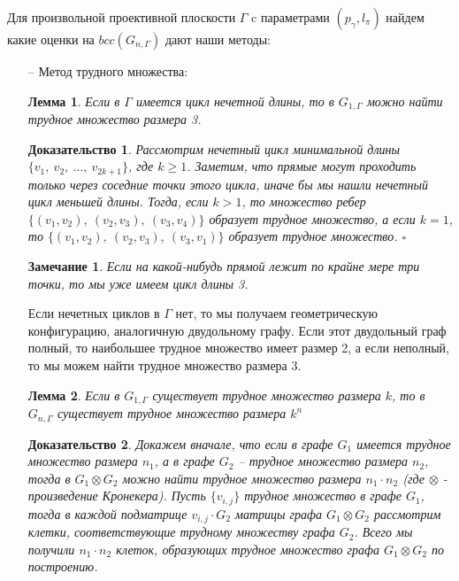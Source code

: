 \documentclass[a4paper]{article}
\newtheorem*{mremark}{Замечание}
\newtheorem*{mlemma}{Лемма}
\newtheorem*{msolution}{Доказательство}
\begin{document}
Для произвольной проективной плоскости $\Gamma$ c параметрами $(p_{\gamma}, l_{\pi})$ найдем какие 
оценки на $bcc(G_{n,\Gamma})$ дают наши методы:

\begin{itemize}
    \item[--] Метод трудного множества:
    \begin{mlemma}
        Если в $\Gamma$ имеется цикл нечетной длины, то в $G_{1, \Gamma}$ можно найти трудное множество 
        размера 3.
    \end{mlemma}
    \begin{msolution}
        Рассмотрим нечетный цикл минимальной длины $\{v_1,\ v_2,\ \ldots,\ v_{2k+1}\}$, где $k \geq 1$.
        Заметим, что прямые могут проходить только через соседние точки этого цикла, иначе бы мы нашли 
        нечетный цикл меньшей длины. Тогда, если $k > 1$, то множество ребер $\{(v_1, v_2),\ (v_2, v_3),
        \ (v_3, v_4)\}$ образует трудное множество, а если $k = 1$, то $\{(v_1, v_2),\ (v_2, v_3),
        \ (v_3, v_1)\}$ образует трудное множество. $\square$
    \end{msolution}
    
    \begin{mremark}
        Если на какой-нибудь прямой лежит по крайне мере три точки, то мы уже имеем цикл длины 3.
    \end{mremark}

     Если нечетных циклов в $\Gamma$ нет, то мы получаем геометрическую конфигурацию, аналогичную 
     двудольному графу. Если этот двудольный граф полный, то наибольшее трудное множество имеет размер 2, 
     а если неполный, то мы можем найти трудное множество размера 3.
     
     \begin{mlemma}
         Если в $G_{1, \Gamma}$ существует трудное множество размера $k$, то в $G_{n, \Gamma}$ 
         существует трудное множество размера $k^n$
     \end{mlemma}
     \begin{msolution}
        Докажем вначале, что если в графе $G_1$ имеется трудное множество размера $n_1$, а в графе 
        $G_2$ -- трудное множество размера $n_2$, тогда в $G_1 \otimes G_2$ можно найти трудное 
        множество размера $n_1\cdot n_2$ (где $\otimes$ - произведение Кронекера). Пусть $\{v_{i,j}\}$ 
        трудное множество в графе $G_1$, тогда в каждой подматрице $v_{i, j}\cdot G_2$ матрицы 
        графа $G_1 \otimes G_2$ рассмотрим клетки, соответствующие трудному множеству графа $G_2$. 
        Всего мы получили $n_1\cdot n_2$ клеток, образующих трудное множество графа $G_1 \otimes G_2$ 
        по построению.
        

\end{msolution}
\end{itemize}
\end{document}
